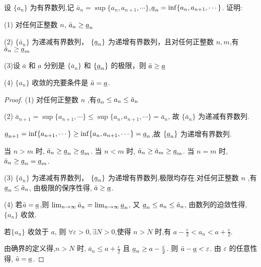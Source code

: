 \begin{practice}
    设 $\{a_n\}$ 为有界数列,记 
    $\bar{a}_n=\sup\{a_n,a_{n+1},\cdots\}$,$\text{\underbar{$a$}}_n=\inf\{a_n,a_{n+1},\cdots\}$. 证明:
    
    (1) 对任何正整数 $n$, $\bar{a}_n \ge \text{\underbar{$a$}}_n$

    (2) $\{\bar{a}_n\}$ 为递减有界数列， $\{\text{\underbar{$a$}}_n\}$ 为递增有界数列，且对任何正整数 $n,m$,有 $\bar{a}_n \ge \text{\underbar{$a$}}_m$ 

    (3)设 $\bar{a}$ 和 $\underbar{a}$ 分别是 $\{\bar{a}_n\}$ 和  $\{\text{\underbar{$a$}}_n\}$ 的极限，则 $\bar{a} \ge \text{\underbar{$a$}}$
    
    (4) $\{a_n\}$ 收敛的充要条件是 $\bar{a}=\text{\underbar{$a$}}$.
\end{practice}

\begin{proof}
    (1) 对任何正整数 $n$ ,有$\text{\underbar{$a$}}_n \le a_n \le \bar{a}_n$

    (2) $\bar{a}_{n+1}=\sup\{a_{n+1},\cdots\}\le \sup\{a_n,a_{n+1},\cdots\}=\bar{a}_{n}$, 故 $\{\bar{a}_n\}$ 为递减有界数列. 

    $\text{\underbar{$a$}}_{n+1}=\inf\{a_{n+1},\cdots\}\ge \inf\{a_n,a_{n+1},\cdots\}=\text{\underbar{$a$}}_n$,故 $\{\text{\underbar{$a$}}_n\}$ 为递增有界数列.

    当 $n>m$ 时, $\bar{a}_n \ge \text{\underbar{$a$}}_n \ge \text{\underbar{$a$}}_m$. 当 $n<m$ 时, $\bar{a}_n \ge \bar{a}_m \ge \text{\underbar{$a$}}_m$. 当 $n=m$ 时, $\bar{a}_n \ge \text{\underbar{$a$}}_n = \text{\underbar{$a$}}_m$.

    (3) $\{\bar{a}_n\}$ 为递减有界数列， $\{\text{\underbar{$a$}}_n\}$ 为递增有界数列,极限均存在.对任何正整数 $n$ ,有$\text{\underbar{$a$}}_n \le \bar{a}_n$, 由极限的保序性得, $\bar{a} \ge \text{\underbar{$a$}}$.

    (4) \chongfen 若$\bar{a}=\text{\underbar{$a$}}$,则 $\lim_{n\to\infty} \bar{a}_n = \lim_{n\to\infty} \text{\underbar{$a$}}_n$, 又 $\text{\underbar{$a$}}_n \le a_n \le \bar{a}_n$, 由数列的迫敛性得, $\{a_n\}$ 收敛.

    \biyao 若$\{a_n\}$ 收敛于 $a$, 则 $\forall \varepsilon>0,\exists N>0$,使得 $ n>N$ 时,有 $a-\frac{\varepsilon}{2}<a_n<a+\frac{\varepsilon}{2}$. 

    由确界的定义得,$n>N$ 时, $\bar{a}_n\le a+\frac{\varepsilon}{2}$ 且 $\text{\underbar{$a$}}_n \ge a-\frac{\varepsilon}{2}$. 则 $\bar{a} - \text{\underbar{$a$}}<\varepsilon$. 由 $\varepsilon$ 的任意性得, $\bar{a}=\text{\underbar{$a$}}$.
\end{proof}
\newsection